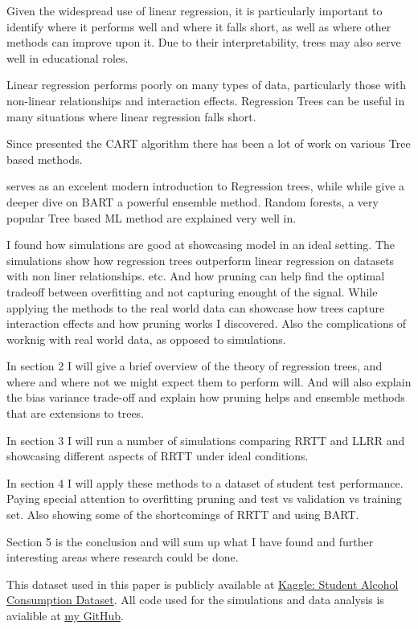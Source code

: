 \documentclass[12pt]{article}
\begin{document}
Given the widespread use of linear regression, it is particularly important to identify where it performs well and where it falls short, as well as where other methods can improve upon it. Due to their interpretability, trees may also serve well in educational roles.

Linear regression performs poorly on many types of data, particularly those with non-linear relationships and interaction effects. Regression Trees can be useful in many situations where linear regression falls short.

Since \citep{breiman1984} presented the CART algorithm there has been a lot of work on various Tree based methods.

\citep{hastie2021} serves as an excelent modern introduction to Regression trees, while while \citep{tan2019} give a deeper dive on BART a powerful ensemble method. 
Random forests, a very popular Tree based ML method are explained very well in\citep{biau2016}.



I found how simulations are good at showcasing model in an ideal setting. The simulations show how regression trees outperform linear regression on datasets with non liner relationships. etc. And how pruning can help find the optimal tradeoff between overfitting and not capturing enought of the signal. While applying the methods to the real world data can showcase how trees capture  interaction effects and how pruning works I discovered. Also the complications of worknig with real world data, as opposed to simulations.

  
In section 2 I will give a brief overview of the theory of regression trees, and where and where not we might expect them to perform will. And will also explain the bias variance trade-off and explain how pruning helps and ensemble methods that are extensions to trees.

In section 3 I will run a number of simulations comparing RRTT and LLRR and showcasing different aspects of RRTT under ideal conditions.

In section 4 I will apply these methods to a dataset of student test performance. Paying special attention to overfitting pruning and test vs validation vs training set. Also showing some of the shortcomings of RRTT and using BART.

Section 5 is the conclusion and will sum up what I have found and further interesting areas where research could be done.

This dataset used in this paper is publicly available at \href{https://www.kaggle.com/datasets/uciml/student-alcohol-consumption}{Kaggle: Student Alcohol Consumption Dataset}. All code used for the simulations and data analysis is avialible at \href{https://github.com/Tim2othy/wissenschaftliches-arbeiten}{my GitHub}.
\end{document}

